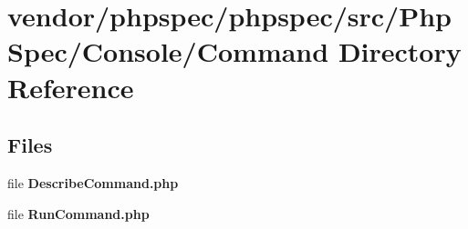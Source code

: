 \section{vendor/phpspec/phpspec/src/\+Php\+Spec/\+Console/\+Command Directory Reference}
\label{dir_6ef626420bdf0562a01f9b7a03fddaae}
\subsection*{Files}
\begin{DoxyCompactItemize}
\item 
file {\bf Describe\+Command.\+php}
\item 
file {\bf Run\+Command.\+php}
\end{DoxyCompactItemize}
